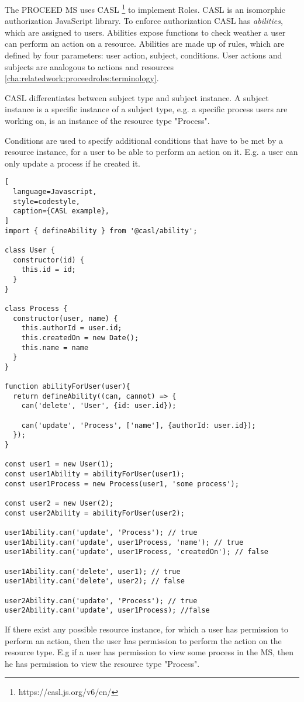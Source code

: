 The PROCEED MS uses CASL \footnote{https://casl.js.org/v6/en/} to implement Roles. 
CASL is an isomorphic authorization JavaScript library.
To enforce authorization CASL has \textit{abilities}, which are assigned to users.
Abilities expose functions to check weather a user can perform an action on a resource.
Abilities are made up of rules, which are defined by four parameters: user action, subject,
conditions.
User actions and subjects are analogous to actions and resources \ref{cha:relatedwork:proceedroles:terminology}.

CASL differentiates between subject type and subject instance.
A subject instance is a specific instance of a subject type, e.g. a specific process
users are working on, is an instance of the resource type "Process".


Conditions are used to specify additional conditions that have to be met by a resource
instance, for a user to be able to perform an action on it. E.g. a user can only update a
process if he created it.

\begin{lstlisting}[
  language=Javascript,
  style=codestyle,
  caption={CASL example},
]
import { defineAbility } from '@casl/ability';

class User {
  constructor(id) {
    this.id = id;
  }
}

class Process {
  constructor(user, name) {
    this.authorId = user.id;
    this.createdOn = new Date();
    this.name = name
  }
}

function abilityForUser(user){
  return defineAbility((can, cannot) => {
    can('delete', 'User', {id: user.id});

    can('update', 'Process', ['name'], {authorId: user.id});
  });
}

const user1 = new User(1);
const user1Ability = abilityForUser(user1);
const user1Process = new Process(user1, 'some process');

const user2 = new User(2);
const user2Ability = abilityForUser(user2);

user1Ability.can('update', 'Process'); // true
user1Ability.can('update', user1Process, 'name'); // true
user1Ability.can('update', user1Process, 'createdOn'); // false

user1Ability.can('delete', user1); // true
user1Ability.can('delete', user2); // false

user2Ability.can('update', 'Process'); // true
user2Ability.can('update', user1Process); //false
\end{lstlisting}

If there exist any possible resource instance, for which a user has permission to perform an action,
then the user has permission to perform the action on the resource type.
E.g if a user has permission to view some process in the MS, then he has permission to
view the resource type "Process".

